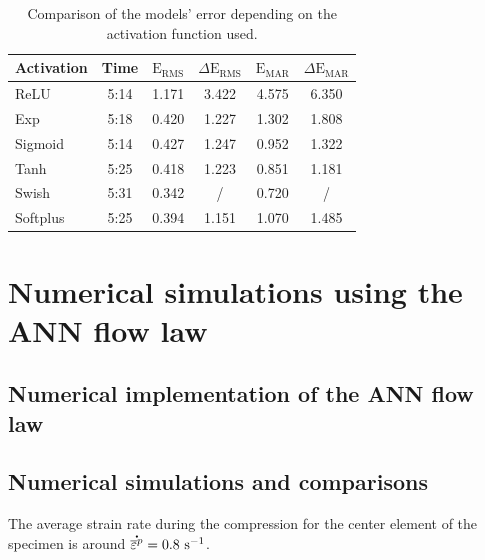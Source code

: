 \documentclass[algorithms,article,submit,pdftex,moreauthors]{Definitions/mdpi}
\DeclareRobustCommand{\mdot}[1]{\accentset{\mbox{\bfseries .}}{#1}}
\DeclareRobustCommand{\RMSE}{\text{E}_\text{RMS}}
\DeclareRobustCommand{\MARE}{\text{E}_\text{MAR}}
\DeclareRobustCommand{\ps}{\text{s}^{-1}}
\begin{document}
\begin{table}[H]
\caption{Comparison of the models' error depending on the activation function used.}
\begin{tabular}{lccccc}
\toprule
Activation & Time & $\RMSE$ & $\Delta\RMSE$ & $\MARE$  & $\Delta\MARE$ \\ \midrule
ReLU & 5:14 & 1.171 & 3.422 & 4.575 & 6.350\\ 
Exp & 5:18 & 0.420 & 1.227 & 1.302 & 1.808\\ 
Sigmoid & 5:14 & 0.427 & 1.247 & 0.952 & 1.322\\ 
Tanh & 5:25 & 0.418 & 1.223 & 0.851 & 1.181\\ 
Swish & 5:31 & 0.342 & / &0.720 & / \\ 
Softplus & 5:25 & 0.394 & 1.151 & 1.070 & 1.485\\
\bottomrule
\end{tabular}
\end{table}


\section{Numerical simulations using the ANN flow law\label{sec:Numerical}}

\subsection{Numerical implementation of the ANN flow law\label{subsec:Num-impl}}

\subsection{Numerical simulations and comparisons\label{subsec:Num-sim}}

The average strain rate during the compression for the center element of the specimen is around $\mdot{\overline{\varepsilon}^p}=0.8~\ps$.
\end{document}
